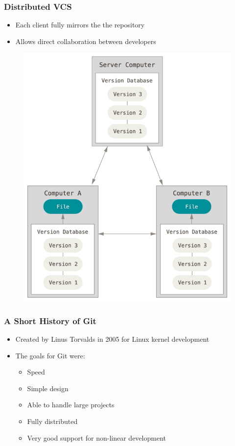 \documentclass{beamer}
\begin{document}
\begin{frame}
	\frametitle{Distributed VCS}
	\begin{itemize}
		\item{Each client fully mirrors the the repository}
		\item{Allows direct collaboration between developers}
	\end{itemize}
	\begin{figure}
		\includegraphics[scale=0.25]{Distributed_VCS-0.png}
	\end{figure}
\end{frame}

\begin{frame}
	\frametitle{A Short History of Git}
	\begin{itemize}
		\item{Created by Linus Torvalds in 2005 for Linux kernel development}
		\item{The goals for Git were:}
		\begin{itemize}
			\item{Speed}
			\item{Simple design}
			\item{Able to handle large projects}
			\item{Fully distributed}
			\item{Very good support for non-linear development}
		\end{itemize}
	\end{itemize}
\end{frame}
\end{document}
